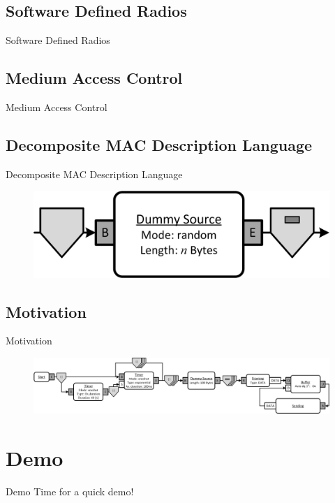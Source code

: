 \documentclass{beamer}
\begin{document}
\subsection{Software Defined Radios}
\begin{frame}{Software Defined Radios}
\end{frame}

\subsection{Medium Access Control}
\begin{frame}{Medium Access Control}
\end{frame}

\subsection{Decomposite MAC Description Language}
\begin{frame}{Decomposite MAC Description Language}
	\begin{figure}
 		\includegraphics[width=\linewidth]{dummy_source.png}
 		\label{fig:aloha}
	\end{figure}
\end{frame}

\subsection{Motivation}
\begin{frame}{Motivation}
	\begin{figure}
 		\includegraphics[width=\linewidth]{pure_aloha.png}
 		\label{fig:aloha}
	\end{figure}
\end{frame}

\section{Demo}
\begin{frame}{Demo}
Time for a quick demo!
\end{frame}
\end{document}

